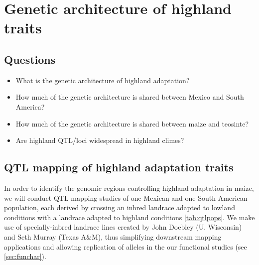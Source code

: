 \section{Genetic architecture of highland traits} \label{qtl}

\subsection*{Questions}
\begin{itemize}
\item What is the genetic architecture of highland adaptation?
\item How much of the genetic architecture is shared between Mexico and South America?
\item How much of the genetic architecture is shared between maize and teosinte?
\item Are highland QTL/loci widespread in highland climes?
\end{itemize}

\subsection{QTL mapping of highland adaptation traits} \label{subsec:qtlmap}

In order to identify the genomic regions controlling highland adaptation in maize, we will conduct QTL mapping studies of one Mexican and one South American population, each derived by crossing an inbred landrace adapted to lowland conditions with a landrace adapted to highland conditions \ref{tab:qtlpops}.  We make use of specially-inbred landrace lines created by John Doebley (U. Wisconsin) and Seth Murray (Texas A\&M), thus simplifying downstream mapping applications and allowing replication of alleles in the our functional studies (see \ref{sec:funchar}). 


